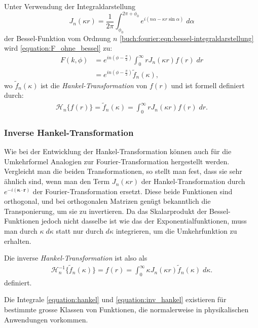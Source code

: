 Unter Verwendung der Integraldarstellung
\begin{equation*}
	J_n(\kappa r)=\frac{1}{2\pi}\int_{\phi_{0}}^{2\pi + \phi_{0}}e^{i(n\alpha-\kappa r \sin \alpha)} \; d\alpha
	\label{equation:bessel_n_ordnung}
\end{equation*}
 der Bessel-Funktion vom Ordnung $n$ \eqref{buch:fourier:eqn:bessel-integraldarstellung} wird \eqref{equation:F_ohne_bessel} zu:
\begin{align}
	F(k,\phi)&=e^{in(\phi-\frac{\pi}{2})}\int_{0}^{\infty}rJ_n(\kappa r) f(r) \; dr  \nonumber \\ 
	&=e^{in(\phi-\frac{\pi}{2})}\tilde{f}_n(\kappa),
	\label{equation:F_mit_bessel_step_2}
\end{align}
wo $\tilde{f}_n(\kappa)$ ist die \textit{Hankel-Transformation} von $f(r)$ und ist formell definiert durch:
\begin{align}
	\mathscr{H}_n\{f(r)\}=\tilde{f}_n(\kappa)=\int_{0}^{\infty}rJ_n(\kappa r) f(r) \; dr.
	\label{equation:hankel}
\end{align}

\subsubsection{Inverse Hankel-Transformation \label{subsub:inverse_hankel_tansformation}}
Wie bei der Entwicklung der Hankel-Transformation können auch für die Umkehrformel Analogien zur Fourier-Transformation hergestellt werden. Vergleicht man die beiden Transformationen, so stellt man fest, dass sie sehr ähnlich sind, wenn man den Term $J_n(\kappa r)$ der Hankel-Transformation durch $e^{-i( \bm{\kappa}\cdot \mathbf{r})}$ der Fourier-Transformation ersetzt. Diese beide Funktionen sind orthogonal, und bei orthogonalen Matrizen genügt bekanntlich die Transponierung, um sie zu invertieren. Da das Skalarprodukt der Bessel-Funktionen jedoch nicht dasselbe ist wie das der Exponentialfunktionen, muss man durch $\kappa\; d\kappa$ statt nur durch $d\kappa$ integrieren, um die Umkehrfunktion zu erhalten.

Die inverse \textit{Hankel-Transformation} ist also als 
\begin{align}
	\mathscr{H}^{-1}_n\{\tilde{f}_n(\kappa)\}=f(r)=\int_{0}^{\infty}\kappa J_n(\kappa r) \tilde{f}_n(\kappa) \; d\kappa.
	\label{equation:inv_hankel}
\end{align}
definiert.

Die Integrale \eqref{equation:hankel} und \eqref{equation:inv_hankel} existieren für bestimmte grosse Klassen von Funktionen, die normalerweise in physikalischen Anwendungen vorkommen.

